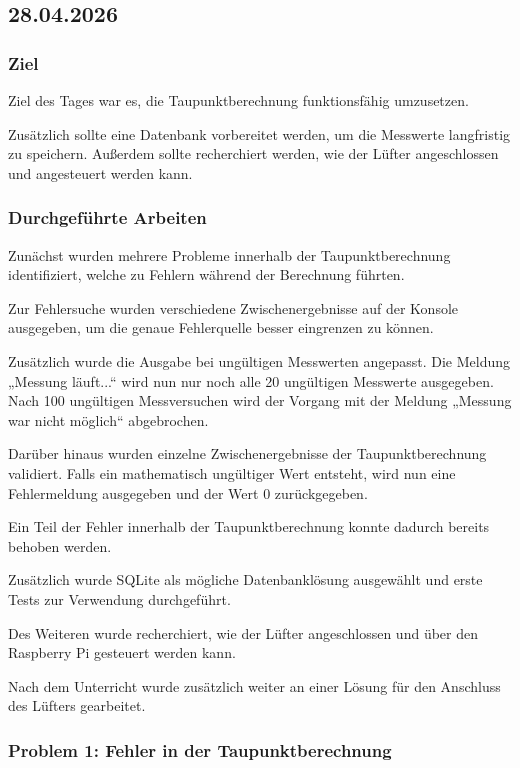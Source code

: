 \subsection{28.04.2026}

\subsubsection{Ziel}

Ziel des Tages war es, die Taupunktberechnung
funktionsfähig umzusetzen.

Zusätzlich sollte eine Datenbank vorbereitet werden,
um die Messwerte langfristig zu speichern.
Außerdem sollte recherchiert werden, wie der Lüfter
angeschlossen und angesteuert werden kann.

\subsubsection{Durchgeführte Arbeiten}

Zunächst wurden mehrere Probleme innerhalb der
Taupunktberechnung identifiziert, welche zu
Fehlern während der Berechnung führten.

Zur Fehlersuche wurden verschiedene
Zwischenergebnisse auf der Konsole ausgegeben,
um die genaue Fehlerquelle besser eingrenzen zu können.

Zusätzlich wurde die Ausgabe bei ungültigen
Messwerten angepasst.
Die Meldung „Messung läuft...“ wird nun nur noch
alle 20 ungültigen Messwerte ausgegeben.
Nach 100 ungültigen Messversuchen wird der
Vorgang mit der Meldung
„Messung war nicht möglich“
abgebrochen.

Darüber hinaus wurden einzelne Zwischenergebnisse
der Taupunktberechnung validiert.
Falls ein mathematisch ungültiger Wert entsteht,
wird nun eine Fehlermeldung ausgegeben und
der Wert 0 zurückgegeben.

Ein Teil der Fehler innerhalb der
Taupunktberechnung konnte dadurch bereits behoben
werden.

Zusätzlich wurde SQLite als mögliche
Datenbanklösung ausgewählt und erste Tests zur
Verwendung durchgeführt.

Des Weiteren wurde recherchiert, wie der Lüfter
angeschlossen und über den Raspberry Pi gesteuert
werden kann.

Nach dem Unterricht wurde zusätzlich weiter an
einer Lösung für den Anschluss des Lüfters gearbeitet.

\subsubsection{Problem 1: Fehler in der Taupunktberechnung}

